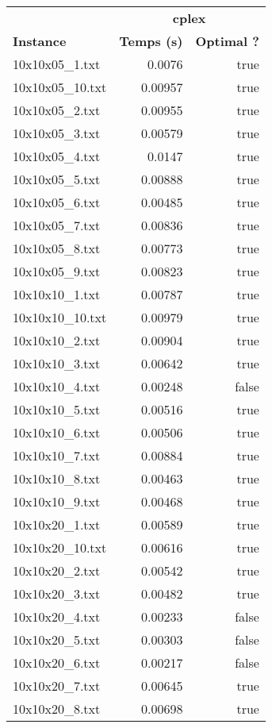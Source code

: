 \documentclass{article}
\begin{document}
\begin{center}
\renewcommand{\arraystretch}{1.4} 
 \begin{tabular}{lrr}
	\hline
 & \multicolumn{2}{c}{\textbf{cplex}}\\
\textbf{Instance}  & \textbf{Temps (s)} & \textbf{Optimal ?} \\\hline

10x10x05\_1.txt & 0.0076 & true
\\
10x10x05\_10.txt & 0.00957 & true
\\
10x10x05\_2.txt & 0.00955 & true
\\
10x10x05\_3.txt & 0.00579 & true
\\
10x10x05\_4.txt & 0.0147 & true
\\
10x10x05\_5.txt & 0.00888 & true
\\
10x10x05\_6.txt & 0.00485 & true
\\
10x10x05\_7.txt & 0.00836 & true
\\
10x10x05\_8.txt & 0.00773 & true
\\
10x10x05\_9.txt & 0.00823 & true
\\
10x10x10\_1.txt & 0.00787 & true
\\
10x10x10\_10.txt & 0.00979 & true
\\
10x10x10\_2.txt & 0.00904 & true
\\
10x10x10\_3.txt & 0.00642 & true
\\
10x10x10\_4.txt & 0.00248 & false
\\
10x10x10\_5.txt & 0.00516 & true
\\
10x10x10\_6.txt & 0.00506 & true
\\
10x10x10\_7.txt & 0.00884 & true
\\
10x10x10\_8.txt & 0.00463 & true
\\
10x10x10\_9.txt & 0.00468 & true
\\
10x10x20\_1.txt & 0.00589 & true
\\
10x10x20\_10.txt & 0.00616 & true
\\
10x10x20\_2.txt & 0.00542 & true
\\
10x10x20\_3.txt & 0.00482 & true
\\
10x10x20\_4.txt & 0.00233 & false
\\
10x10x20\_5.txt & 0.00303 & false
\\
10x10x20\_6.txt & 0.00217 & false
\\
10x10x20\_7.txt & 0.00645 & true
\\
10x10x20\_8.txt & 0.00698 & true
\\
\hline\end{tabular}
\end{center}
\end{document}
